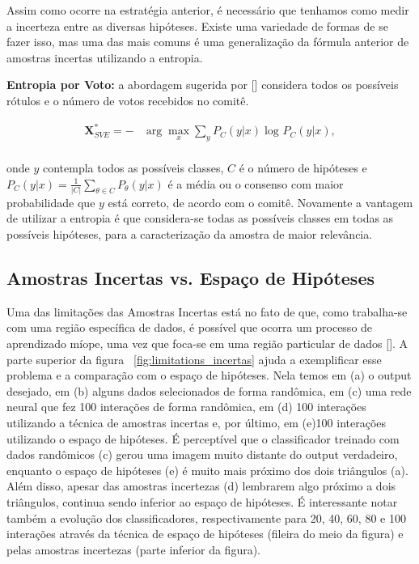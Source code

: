 Assim como ocorre na estratégia anterior, é necessário que tenhamos como medir a incerteza entre as diversas hipóteses. Existe uma variedade de formas de se fazer isso, mas uma das mais comuns é uma generalização da fórmula anterior de amostras incertas utilizando a entropia.

\textbf{Entropia por Voto:} a abordagem sugerida por [\cite{dagan1995committee}] considera todos os possíveis rótulos e o número de votos recebidos no comitê. 

\begin{align*}
\textbf{X}^*_{SVE} = - &\arg\max_{x} \sum_{y} P_{C}  (y\lvert x) \log_{} P_{C}  (y\lvert x),\\
\end{align*}

onde $y$ contempla todos as possíveis classes, $C$ é o número de hipóteses e $P_{C}  (y\lvert x) = \frac{1}{|C|}  \sum_{\theta \in C} P_{\theta}  (y\lvert x)$ é a média ou o consenso com maior probabilidade que $y$ está correto, de acordo com o comitê. Novamente a vantagem de utilizar a entropia é que considera-se todas as possíveis classes em todas as possíveis hipóteses, para a caracterização da amostra de maior relevância.


\subsection{Amostras Incertas vs. Espaço de Hipóteses} 
\label{sec:minimizing_expected}

Uma das limitações das Amostras Incertas está no fato de que, como trabalha-se com uma região específica de dados, é possível que ocorra um processo de aprendizado míope, uma vez que foca-se em uma região particular de dados [\cite{settles2014active}]. A parte superior da figura ~\ref{fig:limitations_incertas} ajuda a exemplificar esse problema e a comparação com o espaço de hipóteses. Nela temos em (a) o output desejado, em (b) alguns dados selecionados de forma randômica, em (c) uma rede neural que fez 100 interações de forma randômica, em (d) 100 interações utilizando a técnica de amostras incertas e, por último, em (e)100 interações utilizando o espaço de hipóteses. É perceptível que o classificador treinado com dados randômicos (c) gerou uma imagem muito distante do output verdadeiro, enquanto o espaço de hipóteses (e) é muito mais próximo dos dois triângulos (a). Além disso, apesar das amostras incertezas (d) lembrarem algo próximo a dois triângulos, continua sendo inferior ao espaço de hipóteses. É interessante notar também a evolução dos classificadores, respectivamente para 20, 40, 60, 80 e 100 interações através da técnica de espaço de hipóteses (fileira do meio da figura) e pelas amostras incertezas (parte inferior da figura).

